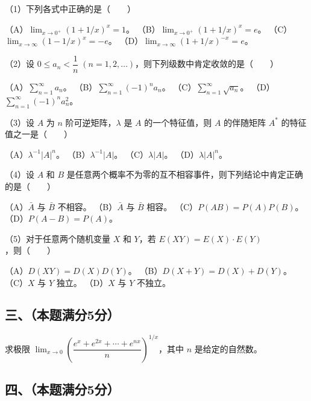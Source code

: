 \documentclass[UTF8,12pt]{ctexart}
\begin{document}
（1）下列各式中正确的是（　　）


（A）\(\displaystyle \lim_{x\to0^+}(1+1/x)^x=1\)。 （B）\(\displaystyle \lim_{x\to0^+}(1+1/x)^x=e\)。 （C）\(\displaystyle \lim_{x\to\infty}(1-1/x)^x=-e\)。 （D）\(\displaystyle \lim_{x\to\infty}(1+1/x)^{-x}=e\)。


（2）设 \(\displaystyle 0\le a_n<\dfrac{\displaystyle 1}{\displaystyle n}\;(n=1,\allowbreak 2,\allowbreak \ldots)\)，则下列级数中肯定收敛的是（　　）


（A）\(\displaystyle \sum_{n=1}^{\infty}a_n\)。 （B）\(\displaystyle \sum_{n=1}^{\infty}(-1)^na_n\)。 （C）\(\displaystyle \sum_{n=1}^{\infty}\sqrt{a_n}\)。 （D）\(\displaystyle \sum_{n=1}^{\infty}(-1)^na_n^2\)。


（3）设 \(\displaystyle A\) 为 \(\displaystyle n\) 阶可逆矩阵，\(\displaystyle \lambda\) 是 \(\displaystyle A\) 的一个特征值，则 \(\displaystyle A\) 的伴随矩阵 \(\displaystyle A^*\) 的特征值之一是（　　）


（A）\(\displaystyle \lambda^{-1}|A|^n\)。 （B）\(\displaystyle \lambda^{-1}|A|\)。 （C）\(\displaystyle \lambda|A|\)。 （D）\(\displaystyle \lambda|A|^n\)。


（4）设 \(\displaystyle A\) 和 \(\displaystyle B\) 是任意两个概率不为零的互不相容事件，则下列结论中肯定正确的是（　　）


（A）\(\displaystyle \bar A\) 与 \(\displaystyle \bar B\) 不相容。 （B）\(\displaystyle \bar A\) 与 \(\displaystyle \bar B\) 相容。 （C）\(\displaystyle P(AB)=P(A)P(B)\)。 （D）\(\displaystyle P(A-B)=P(A)\)。


（5）对于任意两个随机变量 \(\displaystyle X\) 和 \(\displaystyle Y\)，若 \(\displaystyle E(XY)=E(X)\cdot E(Y)\)，则（　　）


（A）\(\displaystyle D(XY)=D(X)D(Y)\)。 （B）\(\displaystyle D(X+Y)=D(X)+D(Y)\)。 （C）\(\displaystyle X\) 与 \(\displaystyle Y\) 独立。 （D）\(\displaystyle X\) 与 \(\displaystyle Y\) 不独立。


\subsection*{三、（本题满分5分）}

求极限 \(\displaystyle \lim_{x\to0}\left(\dfrac{\displaystyle e^x+e^{2x}+\cdots+e^{nx}}{\displaystyle n}\right)^{1/x}\)，其中 \(\displaystyle n\) 是给定的自然数。


\subsection*{四、（本题满分5分）}
\end{document}
